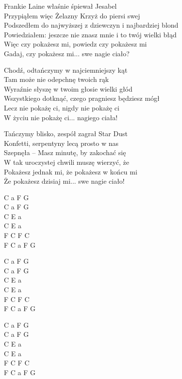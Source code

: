 \begin{text}
    Frankie Laine właśnie śpiewał Jesabel\\
    Przypiąłem więc Żelazny Krzyż do piersi swej\\
    Podszedłem do najwyższej z dziewczyn i najbardziej blond\\
    Powiedziałem: jeszcze nie znasz mnie i to twój wielki błąd\\
    \vin Więc czy pokażesz mi, powiedz czy pokażesz mi\\
    \vin Gadaj, czy pokażesz mi... swe nagie ciało?

    Chodź, odtańczymy w najciemniejszy kąt\\
    Tam może nie odepchnę twoich rąk\\
    Wyraźnie słyszę w twoim głosie wielki głód\\
    Wszystkiego dotknąć, czego pragniesz będziesz mógł\\
    \vin Lecz nie pokażę ci, nigdy nie pokażę ci\\
    \vin W życiu nie pokażę ci... nagiego ciała!

    Tańczymy blisko, zespół zagrał Star Dust\\
    Konfetti, serpentyny lecą prosto w nas\\
    Szepnęła – Masz minutę, by zakochać się\\
    W tak uroczystej chwili muszę wierzyć, że\\
    \vin Pokażesz jednak mi, że pokażesz w końcu mi\\
    \vin Że pokażesz dzisiaj mi... swe nagie ciało!
\end{text}
\begin{chord}
    C a F G\\
    C a F G\\
    C E a\\
    C E a\\
    F C F C\\
    F C a F G
    
    C a F G\\
    C a F G\\
    C E a\\
    C E a\\
    F C F C\\
    F C a F G
    
    C a F G\\
    C a F G\\
    C E a\\
    C E a\\
    F C F C\\
    F C a F G
\end{chord}